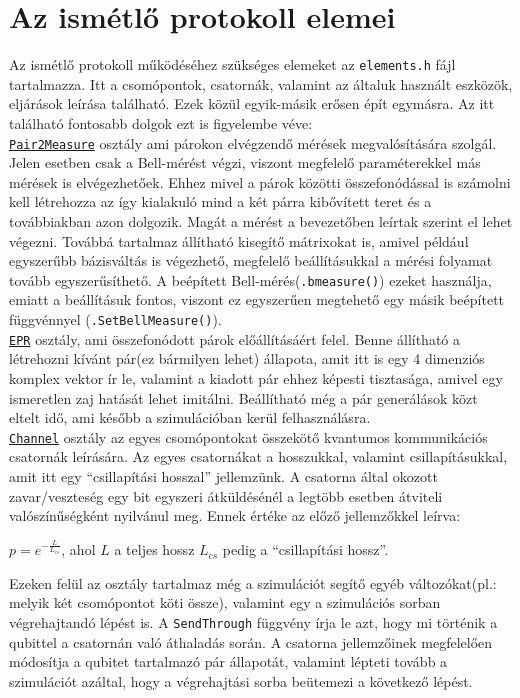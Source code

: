 \section{Az ismétlő protokoll elemei }

Az ismétlő protokoll működéséhez szükséges elemeket az \texttt{elements.h} fájl tartalmazza. Itt a csomópontok, csatornák, valamint az általuk használt eszközök, eljárások leírása található. Ezek közül egyik-másik erősen épít egymásra. Az itt található fontosabb dolgok ezt is figyelembe véve:\\
\underline{\texttt{Pair2Measure}} osztály ami párokon elvégzendő mérések megvalósítására szolgál. Jelen esetben csak a Bell-mérést végzi, viszont megfelelő paraméterekkel más mérések is elvégezhetőek.  Ehhez mivel a párok közötti összefonódással is számolni kell létrehozza az így kialakuló mind a két párra kibővített teret és a továbbiakban azon dolgozik. Magát a mérést a bevezetőben leírtak szerint el lehet végezni. Továbbá tartalmaz állítható kisegítő mátrixokat is, amivel például egyszerűbb bázisváltás is végezhető, megfelelő beállításukkal a mérési folyamat tovább egyszerűsíthető. A beépített Bell-mérés(\texttt{.bmeasure()}) ezeket használja, emiatt a beállításuk fontos, viszont ez egyszerűen megtehető egy másik beépített függvénnyel (\texttt{.SetBellMeasure()}).\\
\underline{\texttt{EPR}} osztály, ami összefonódott párok előállításáért felel. Benne állítható a létrehozni kívánt pár(ez bármilyen lehet) állapota, amit itt is egy 4 dimenziós komplex vektor ír le, valamint a kiadott pár ehhez képesti tisztasága, amivel egy ismeretlen zaj hatását lehet imitálni. Beállítható még a pár generálások közt eltelt idő, ami később a szimulációban kerül felhasználásra.\\
\underline{\texttt{Channel}} osztály az egyes csomópontokat összekötő kvantumos kommunikációs csatornák leírására. Az egyes csatornákat a hosszukkal, valamint csillapításukkal, amit itt egy ``csillapítási hosszal'' jellemzünk. A csatorna által okozott zavar/veszteség egy bit egyszeri átküldésénél a legtöbb esetben átviteli valószínűségként nyilvánul meg. Ennek értéke az előző jellemzőkkel leírva:
\begin{center}
$ p=e^{-\frac{L}{L_{cs}}}$, ahol $L$ a teljes hossz $L_{cs}$  pedig a ``csillapítási hossz''.\\
\end{center}
Ezeken felül az osztály tartalmaz még a szimulációt segítő egyéb változókat(pl.: melyik két csomópontot köti össze), valamint egy a szimulációs sorban végrehajtandó lépést is. A \texttt{SendThrough} függvény írja le azt, hogy mi történik a qubittel a csatornán való áthaladás során. A csatorna jellemzőinek megfelelően módosítja a qubitet tartalmazó pár állapotát, valamint lépteti tovább a szimulációt azáltal, hogy a végrehajtási sorba beütemezi a következő lépést.\\
